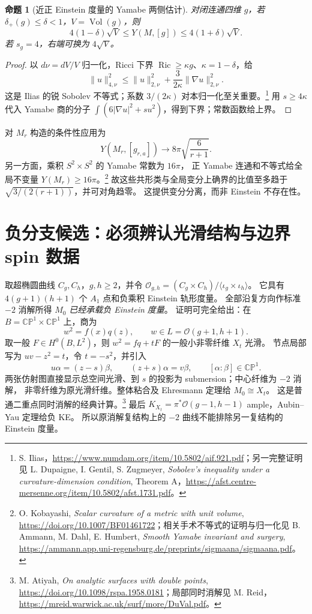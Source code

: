 \documentclass[UTF8,fontset=fandol,zihao=-4,oneside,openany]{ctexbook}
\theoremstyle{cjkplain}
\newtheorem{proposition}[theorem]{命题}
\numberwithin{equation}{chapter}
\DeclareMathOperator{\Ric}{Ric}
\begin{document}
\begin{proposition}[近正 Einstein 度量的 Yamabe 两侧估计]
对闭连通四维 \(g\)，若 \(\delta_+(g)\le\delta<1\)，\(V=\operatorname{Vol}(g)\)，则
\[
4(1-\delta)\sqrt V\le Y(M,[g])\le4(1+\delta)\sqrt V.
\]
若 \(s_g=4\)，右端可换为 \(4\sqrt V\)。
\end{proposition}
\begin{proof}
以 \(d\nu=dV/V\) 归一化，Ricci 下界 \(\Ric\ge\kappa g\)、\(\kappa=1-\delta\)，给
\[
\|u\|_{4,\nu}^2\le\|u\|_{2,\nu}^2+\frac3{2\kappa}\|\nabla u\|_{2,\nu}^2.
\]
这是 Ilias 的锐 Sobolev 不等式；系数 \(3/(2\kappa)\) 对本归一化至关重要。\footnote{S. Ilias，\url{https://www.numdam.org/item/10.5802/aif.921.pdf}；另一完整证明见 L. Dupaigne, I. Gentil, S. Zugmeyer, \emph{Sobolev's inequality under a curvature-dimension condition}, Theorem A，\url{https://afst.centre-mersenne.org/item/10.5802/afst.1731.pdf}。}
用 \(s\ge4\kappa\) 代入 Yamabe 商的分子 \(\int(6|\nabla u|^2+su^2)\)，得到下界；常数函数给上界。
\end{proof}
对 \(M_r\) 构造的条件性应用为
\[
Y(M_r,[g_{r,a}])\longrightarrow8\pi\sqrt{\frac6{r+1}}.
\]
另一方面，乘积 \(S^2\times S^2\) 的 Yamabe 常数为 \(16\pi\)，
正 Yamabe 连通和不等式给全局不变量 \(Y(M_r)\ge16\pi\)。\footnote{O. Kobayashi, \emph{Scalar curvature of a metric with unit volume}, \url{https://doi.org/10.1007/BF01461722}；相关手术不等式的证明与归一化见 B. Ammann, M. Dahl, E. Humbert, \emph{Smooth Yamabe invariant and surgery}, \url{https://ammann.app.uni-regensburg.de/preprints/sigmaana/sigmaana.pdf}。}
故这些共形类与全局变分上确界的比值至多趋于
\(\sqrt{3/(2(r+1))}\)，并可对角趋零。
这提供变分分离，而非 Einstein 不存在性。

\section{负分支候选：必须辨认光滑结构与边界 spin 数据}
\label{FND:negativefilters}

取超椭圆曲线 \(C_g,C_h\)，\(g,h\ge2\)，并令
\(\mathcal O_{g,h}=(C_g\times C_h)/\langle\iota_g\times\iota_h\rangle\)。
它具有 \(4(g+1)(h+1)\) 个 \(A_1\) 点和负乘积 Einstein 轨形度量。
全部沿复方向作标准 \(-2\) 消解所得 \(M_0\) \emph{已经承载负 Einstein 度量}。
证明可完全给出：在 \(B=\mathbb{CP}^1\times\mathbb{CP}^1\) 上，商为
\[
w^2=f(x)q(z),\qquad w\in L=\mathcal O(g+1,h+1).
\]
取一般 \(F\in H^0(B,L^2)\)，则 \(w^2=fq+tF\) 的一般小非零纤维 \(X_t\) 光滑。
节点局部写为 \(uv-z^2=t\)，令 \(t=-s^2\)，并引入
\[
u\alpha=(z-s)\beta,\qquad(z+s)\alpha=v\beta,
\qquad[\alpha:\beta]\in\mathbb{CP}^1.
\]
两张仿射图直接显示总空间光滑、到 \(s\) 的投影为 submersion；中心纤维为 \(-2\) 消解，
非零纤维为原光滑纤维。整体粘合及 Ehresmann 定理给 \(M_0\cong X_t\)。
这是普通二重点同时消解的经典计算。\footnote{M. Atiyah, \emph{On analytic surfaces with double points}, \url{https://doi.org/10.1098/rspa.1958.0181}；局部同时消解见 M. Reid，\url{https://mreid.warwick.ac.uk/surf/more/DuVal.pdf}。}
最后
\(K_{X_t}=\pi^*\mathcal O(g-1,h-1)\) ample，Aubin--Yau 定理给负 KE。
所以原消解复结构上的 \(-2\) 曲线不能排除另一复结构的 Einstein 度量。
\end{document}
